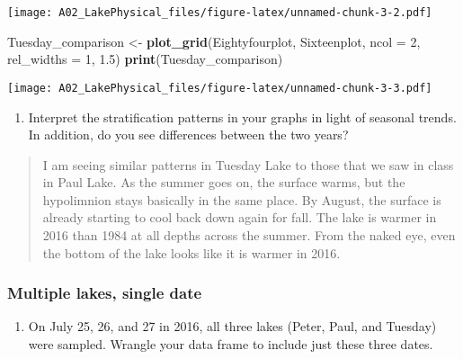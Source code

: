 \documentclass[]{article}
\newenvironment{Shaded}{\begin{snugshade}}{\end{snugshade}}
\newcommand{\DataTypeTok}[1]{\textcolor[rgb]{0.13,0.29,0.53}{#1}}
\newcommand{\DecValTok}[1]{\textcolor[rgb]{0.00,0.00,0.81}{#1}}
\newcommand{\FloatTok}[1]{\textcolor[rgb]{0.00,0.00,0.81}{#1}}
\newcommand{\KeywordTok}[1]{\textcolor[rgb]{0.13,0.29,0.53}{\textbf{#1}}}
\newcommand{\NormalTok}[1]{#1}
\newcommand{\StringTok}[1]{\textcolor[rgb]{0.31,0.60,0.02}{#1}}
\providecommand{\tightlist}{%
  \setlength{\itemsep}{0pt}\setlength{\parskip}{0pt}}
\begin{document}
\texttt{[image: A02\_LakePhysical\_files/figure-latex/unnamed-chunk-3-2.pdf]}

\begin{Shaded}
\begin{Highlighting}[]
\NormalTok{Tuesday_comparison <-}
\StringTok{  }\KeywordTok{plot_grid}\NormalTok{(Eightyfourplot, Sixteenplot, }\DataTypeTok{ncol =} \DecValTok{2}\NormalTok{, }\DataTypeTok{rel_widths =} \DecValTok{1}\NormalTok{, }\FloatTok{1.5}\NormalTok{)}
\KeywordTok{print}\NormalTok{(Tuesday_comparison)}
\end{Highlighting}
\end{Shaded}

\texttt{[image: A02\_LakePhysical\_files/figure-latex/unnamed-chunk-3-3.pdf]}

\begin{enumerate}
\def\labelenumi{\arabic{enumi}.}
\setcounter{enumi}{6}
\tightlist
\item
  Interpret the stratification patterns in your graphs in light of
  seasonal trends. In addition, do you see differences between the two
  years?
\end{enumerate}

\begin{quote}
I am seeing similar patterns in Tuesday Lake to those that we saw in
class in Paul Lake. As the summer goes on, the surface warms, but the
hypolimnion stays basically in the same place. By August, the surface is
already starting to cool back down again for fall. The lake is warmer in
2016 than 1984 at all depths across the summer. From the naked eye, even
the bottom of the lake looks like it is warmer in 2016.
\end{quote}

\hypertarget{multiple-lakes-single-date}{%
\subsubsection{Multiple lakes, single
date}\label{multiple-lakes-single-date}}

\begin{enumerate}
\def\labelenumi{\arabic{enumi}.}
\setcounter{enumi}{7}
\tightlist
\item
  On July 25, 26, and 27 in 2016, all three lakes (Peter, Paul, and
  Tuesday) were sampled. Wrangle your data frame to include just these
  three dates.
\end{enumerate}
\end{document}
